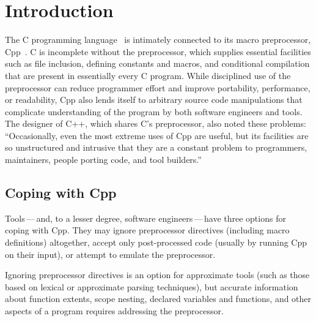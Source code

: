 \documentclass[11pt]{article}
\begin{document}
\bigskip

\section{Introduction}

The C programming language~\cite{ansi} is intimately connected to its macro
preprocessor, Cpp~\cite[Ch.~3]{Harbison91}.   C is incomplete without the
preprocessor, which supplies essential 
facilities such as file inclusion, defining constants and macros, and
conditional compilation that are present in essentially every C program.
While disciplined use of  the preprocessor can reduce programmer effort and 
improve portability, performance, or readability, Cpp also lends itself to
arbitrary source code manipulations that complicate understanding of the
program by both software engineers and tools.  The designer of C++, which
shares C's preprocessor, also noted these problems:
``Occasionally, even the most extreme uses of Cpp are useful, but its
facilities are so unstructured and intrusive that they are a constant
problem to programmers, maintainers, people porting code, and tool
builders.''~\cite[p.~424]{Stroustrup-DesignEvolution}

\subsection{Coping with Cpp}

Tools\,---\,and, to a lesser degree, software engineers\,---\,have three
options for coping with Cpp.    They may ignore preprocessor directives
(including macro definitions) altogether, accept only post-processed code
(usually by running Cpp on their input), or attempt to emulate the
preprocessor.

Ignoring preprocessor directives is an option for approximate tools (such
as those based on lexical or approximate parsing techniques), but accurate
information about function extents, scope nesting, declared variables and
functions, and other aspects of a program requires addressing the
preprocessor.
\end{document}
